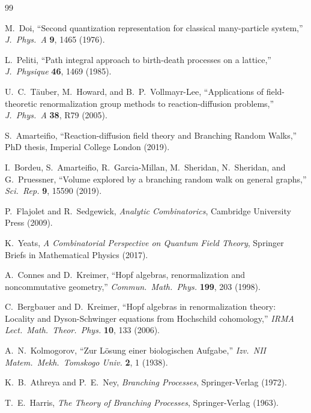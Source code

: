 \documentclass[11pt,a4paper]{article}
\theoremstyle{definition}
\begin{document}
\clearpage

\begin{thebibliography}{99}

M.~Doi, ``Second quantization representation for classical many-particle system,''
\emph{J.\ Phys.\ A} \textbf{9}, 1465 (1976).

L.~Peliti, ``Path integral approach to birth-death processes on a lattice,''
\emph{J.\ Physique} \textbf{46}, 1469 (1985).

U.~C.~T\"auber, M.~Howard, and B.~P.~Vollmayr-Lee,
``Applications of field-theoretic renormalization group methods to
reaction-diffusion problems,''
\emph{J.\ Phys.\ A} \textbf{38}, R79 (2005).

S.~Amarteifio, ``Reaction-diffusion field theory and Branching Random Walks,''
PhD thesis, Imperial College London (2019).

I.~Bordeu, S.~Amarteifio, R.~Garcia-Millan, M.~Sheridan, N.~Sheridan, and
G.~Pruessner,
``Volume explored by a branching random walk on general graphs,''
\emph{Sci.\ Rep.} \textbf{9}, 15590 (2019).

P.~Flajolet and R.~Sedgewick, \emph{Analytic Combinatorics},
Cambridge University Press (2009).

K.~Yeats, \emph{A Combinatorial Perspective on Quantum Field Theory},
Springer Briefs in Mathematical Physics (2017).

A.~Connes and D.~Kreimer, ``Hopf algebras, renormalization and
noncommutative geometry,''
\emph{Commun.\ Math.\ Phys.} \textbf{199}, 203 (1998).

C.~Bergbauer and D.~Kreimer, ``Hopf algebras in renormalization theory:
Locality and Dyson-Schwinger equations from Hochschild cohomology,''
\emph{IRMA Lect.\ Math.\ Theor.\ Phys.} \textbf{10}, 133 (2006).

A.~N.~Kolmogorov, ``Zur L\"osung einer biologischen Aufgabe,''
\emph{Izv.\ NII Matem.\ Mekh.\ Tomskogo Univ.} \textbf{2}, 1 (1938).

K.~B.~Athreya and P.~E.~Ney, \emph{Branching Processes},
Springer-Verlag (1972).

T.~E.~Harris, \emph{The Theory of Branching Processes},
Springer-Verlag (1963).


\end{thebibliography}
\end{document}
